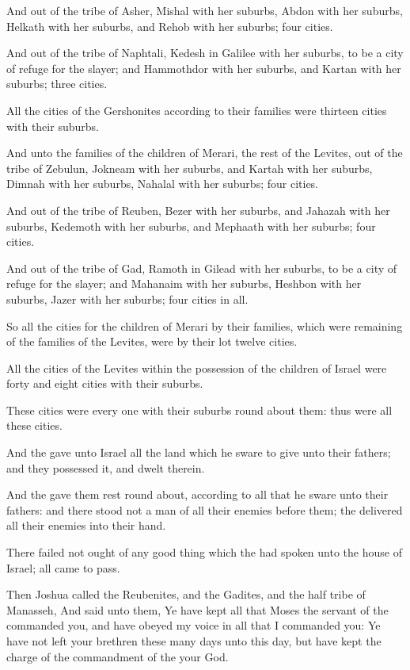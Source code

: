 \Verse And out of the tribe of Asher, Mishal with her suburbs, Abdon with her suburbs, \Verse Helkath with her suburbs, and Rehob with her suburbs; four cities.

\Verse And out of the tribe of Naphtali, Kedesh in Galilee with her suburbs, to be a city of refuge for the slayer; and Hammothdor with her suburbs, and Kartan with her suburbs; three cities.

\Verse All the cities of the Gershonites according to their families were thirteen cities with their suburbs.

\Verse And unto the families of the children of Merari, the rest of the Levites, out of the tribe of Zebulun, Jokneam with her suburbs, and Kartah with her suburbs, \Verse Dimnah with her suburbs, Nahalal with her suburbs; four cities.

\Verse And out of the tribe of Reuben, Bezer with her suburbs, and Jahazah with her suburbs, \Verse Kedemoth with her suburbs, and Mephaath with her suburbs; four cities.

\Verse And out of the tribe of Gad, Ramoth in Gilead with her suburbs, to be a city of refuge for the slayer; and Mahanaim with her suburbs, \Verse Heshbon with her suburbs, Jazer with her suburbs; four cities in all.

\Verse So all the cities for the children of Merari by their families, which were remaining of the families of the Levites, were by their lot twelve cities.

\Verse All the cities of the Levites within the possession of the children of Israel were forty and eight cities with their suburbs.

\Verse These cities were every one with their suburbs round about them: thus were all these cities.

\Verse And the \LORD gave unto Israel all the land which he sware to give unto their fathers; and they possessed it, and dwelt therein.

\Verse And the \LORD gave them rest round about, according to all that he sware unto their fathers: and there stood not a man of all their enemies before them; the \LORD delivered all their enemies into their hand.

\Verse There failed not ought of any good thing which the \LORD had spoken unto the house of Israel; all came to pass.


\Chapter
\Verse Then Joshua called the Reubenites, and the Gadites, and the half tribe of Manasseh, \Verse And said unto them, Ye have kept all that Moses the servant of the \LORD commanded you, and have obeyed my voice in all that I commanded you: \Verse Ye have not left your brethren these many days unto this day, but have kept the charge of the commandment of the \LORD your God.

